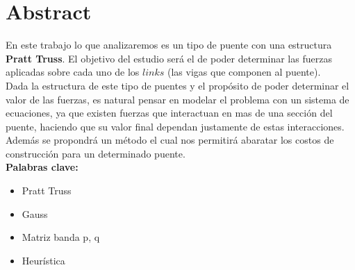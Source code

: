 \section{Abstract}

En este trabajo lo que analizaremos es un tipo de puente con una estructura {\bf Pratt Truss}. El objetivo del estudio será el de poder determinar las fuerzas aplicadas sobre cada uno de los $links$ (las vigas que componen al puente).\\

Dada la estructura de este tipo de puentes y el propósito de poder determinar el valor de las fuerzas, es natural pensar en modelar el problema con un sistema de ecuaciones, ya que existen fuerzas que interactuan en mas de una sección del puente, haciendo que su valor final dependan justamente de estas interacciones.\\

Además se propondrá un método el cual nos permitirá abaratar los costos de construcción para un determinado puente.\\

{\bf Palabras clave:}
\begin{itemize}
    \item Pratt Truss
    \item Gauss
    \item Matriz banda p, q
    \item Heurística
\end{itemize}
